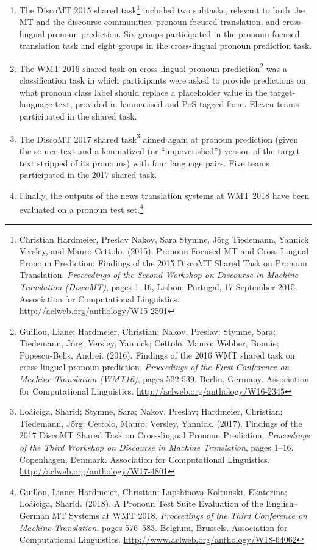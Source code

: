 \documentclass[11pt]{article}
\begin{document}
\begin{enumerate}
    \item The DiscoMT 2015 shared task\footnote{Christian Hardmeier, Preslav Nakov, Sara Stymne, Jörg Tiedemann, Yannick Versley, and Mauro Cettolo. (2015). Pronoun-Focused MT and Cross-Lingual Pronoun Prediction: Findings of the 2015 DiscoMT Shared Task on Pronoun Translation.  \textit{Proceedings of the Second Workshop on Discourse in Machine Translation (DiscoMT)}, pages 1–16, Lisbon, Portugal, 17 September 2015.  Association for Computational Linguistics.  \url{http://aclweb.org/anthology/W15-2501}} included two subtasks, relevant to both the MT and the discourse communities: pronoun-focused translation, and cross-lingual pronoun prediction.  Six groups participated in the pronoun-focused translation task and eight groups in the cross-lingual pronoun prediction task.
    
    \item The WMT 2016 shared task on cross-lingual pronoun prediction\footnote{Guillou, Liane; Hardmeier, Christian; Nakov, Preslav; Stymne, Sara; Tiedemann, Jörg; Versley, Yannick; Cettolo, Mauro; Webber, Bonnie; Popescu-Belis, Andrei. (2016).  Findings of the 2016 WMT shared task on cross-lingual pronoun prediction, \textit{Proceedings of the First Conference on Machine Translation (WMT16)}, pages 522-539.  Berlin, Germany. Association for Computational Linguistics. \url{http://aclweb.org/anthology/W16-2345}} was a  classification  task  in which  participants  were  asked  to  provide predictions  on  what  pronoun  class  label should replace a placeholder value in the target-language  text,  provided  in  lemmatised and PoS-tagged form.  Eleven  teams  participated  in the  shared  task.
    
    \item The DiscoMT 2017 shared task\footnote{Lo{\'a}iciga, Sharid; Stymne, Sara; Nakov, Preslav; Hardmeier, Christian; Tiedemann, J{\"o}rg; Cettolo, Mauro; Versley, Yannick. (2017). Findings of the 2017 DiscoMT Shared Task on Cross-lingual Pronoun Prediction, \textit{Proceedings of the Third Workshop on Discourse in Machine Translation}, pages 1--16. Copenhagen, Denmark. Association for Computational Linguistics.  \url{http://aclweb.org/anthology/W17-4801}} aimed again at pronoun prediction (given the source text and a lemmatized (or ``impoverished'') version of the target text stripped of its pronouns) with four language pairs.   Five teams participated in the 2017 shared task.
    
    \item Finally, the outputs of the news translation systems at WMT 2018 have been evaluated on a pronoun test set.\footnote{Guillou, Liane; Hardmeier, Christian; Lapshinova-Koltunski, Ekaterina; Lo\'{a}iciga, Sharid.  (2018). A Pronoun Test Suite Evaluation of the English--German MT Systems at WMT 2018.  \textit{Proceedings of the Third Conference on Machine Translation}, pages 576--583. Belgium, Brussels.  Association for Computational Linguistics. \url{http://www.aclweb.org/anthology/W18-64062}}
\end{enumerate}
\end{document}
